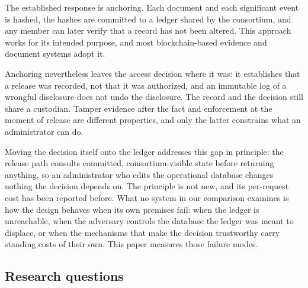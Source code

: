 \documentclass[preprint,12pt]{elsarticle}
\begin{document}
The established response is anchoring. Each document and each significant event
is hashed, the hashes are committed to a ledger shared by the consortium, and
any member can later verify that a record has not been altered. This approach
works for its intended purpose, and most blockchain-based evidence and document
systems adopt it.

Anchoring nevertheless leaves the access decision where it was: it
establishes that a release was recorded, not that it was authorized, and an
immutable log of a wrongful disclosure does not undo the disclosure. The
record and the decision still share a custodian. Tamper evidence after the
fact and enforcement at the moment of release are different properties, and
only the latter constrains what an administrator can do.

Moving the decision itself onto the ledger addresses this gap in principle:
the release path consults committed, consortium-visible state before
returning anything, so an administrator who edits the operational database
changes nothing the decision depends on. The principle is not new, and its
per-request cost has been reported before. What no system in our comparison
examines is how the design behaves when its own premises fail: when the ledger is unreachable, when the adversary
controls the database the ledger was meant to displace, or when the
mechanisms that make the decision trustworthy carry standing costs of their
own. This paper measures those failure modes.

\subsection{Research questions}
\label{sec:rqs}
\end{document}
